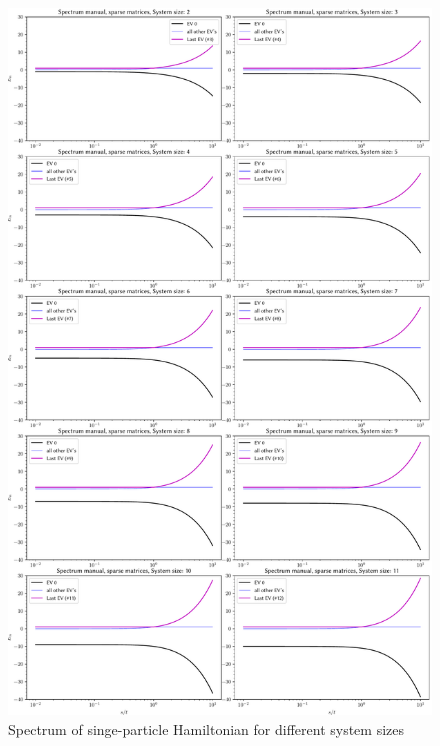     \begin{figure}[!t]
        \centering
        \includegraphics[width=\textwidth]{graphics/spectrum_manual.pdf}
        \caption{Spectrum of singe-particle Hamiltonian for different system sizes}
        \label{fig:spectrum_manual}
    \end{figure}
    \clearpage

